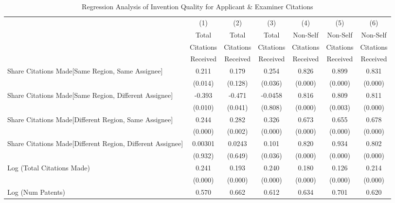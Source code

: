 \documentclass[12pt,letterpaper]{article}
\begin{document}
\begin{table}[htbp]\centering \caption{Regression Analysis of Invention Quality for Applicant \& Examiner Citations \label{ae.model123192021}}
\scriptsize
\singlespacing
\begin{tabular}{l*{6}{c}} \hline
                &\multicolumn{1}{c}{(1)}&\multicolumn{1}{c}{(2)}&\multicolumn{1}{c}{(3)}&\multicolumn{1}{c}{(4)}&\multicolumn{1}{c}{(5)}&\multicolumn{1}{c}{(6)}\\
                &\multicolumn{1}{c}{Total}&\multicolumn{1}{c}{Total}&\multicolumn{1}{c}{Total}&\multicolumn{1}{c}{Non-Self}&\multicolumn{1}{c}{Non-Self}&\multicolumn{1}{c}{Non-Self}\\
                &\multicolumn{1}{c}{Citations}&\multicolumn{1}{c}{Citations}&\multicolumn{1}{c}{Citations}&\multicolumn{1}{c}{Citations}&\multicolumn{1}{c}{Citations}&\multicolumn{1}{c}{Citations}\\
                 &\multicolumn{1}{c}{Received}&\multicolumn{1}{c}{Received}&\multicolumn{1}{c}{Received}&\multicolumn{1}{c}{Received}&\multicolumn{1}{c}{Received}&\multicolumn{1}{c}{Received}\\
\hline
Share Citations Made[Same Region, Same Assignee]&    0.211&    0.179&    0.254&    0.826&    0.899&    0.831\\
                &  (0.014)&  (0.128)&  (0.036)&  (0.000)&  (0.000)&  (0.000)\\
Share Citations Made[Same Region, Different Assignee]&   -0.393&   -0.471&  -0.0458&    0.816&    0.809&    0.811\\
                &  (0.010)&  (0.041)&  (0.808)&  (0.000)&  (0.003)&  (0.000)\\
Share Citations Made[Different Region, Same Assignee]&    0.244&    0.282&    0.326&    0.673&    0.655&    0.678\\
                &  (0.000)&  (0.002)&  (0.000)&  (0.000)&  (0.000)&  (0.000)\\
Share Citations Made[Different Region, Different Assignee]&  0.00301&   0.0243&    0.101&    0.820&    0.934&    0.802\\
                &  (0.932)&  (0.649)&  (0.036)&  (0.000)&  (0.000)&  (0.000)\\
Log (Total Citations Made)&    0.241&    0.193&    0.240&    0.180&    0.126&    0.214\\
                &  (0.000)&  (0.000)&  (0.000)&  (0.000)&  (0.000)&  (0.000)\\
Log (Num Patents)&    0.570&    0.662&    0.612&    0.634&    0.701&    0.620\\

\end{tabular}
\end{table}
\end{document}
